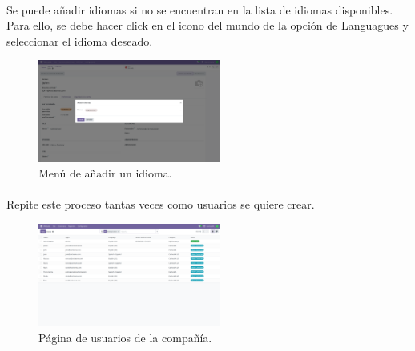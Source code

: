 \documentclass[paper=a4wide, fontsize=11pt]{report}	 %
\begin{document}
\paragraph{}
Se puede añadir idiomas si no se encuentran en la lista de idiomas disponibles. Para ello, se debe hacer click en el icono del mundo de la opción de Languagues y seleccionar el idioma deseado.
\begin{figure}[h]
    \centering
    \includegraphics[width=6cm]{añadirIdioma.png}
    \caption{Menú de añadir un idioma.}
    \label{fig:faqs}
\end{figure}
\paragraph{}
Repite este proceso tantas veces como usuarios se quiere crear.
\begin{figure}[h]
    \centering
    \includegraphics[width=6cm]{usuarios.png}
    \caption{Página de usuarios de la compañía.}
    \label{fig:faqs}
\end{figure}
\end{document}
